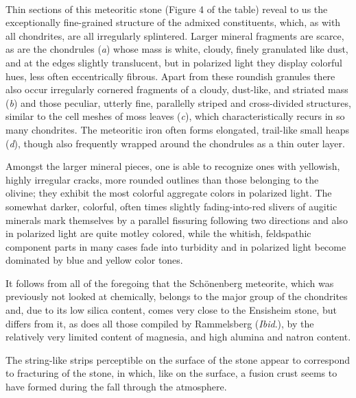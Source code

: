 \documentclass[a4paper, 12pt, oneside]{article}
\begin{document}
\paragraph*{}
Thin sections of this meteoritic stone (Figure 4 of the table) reveal to us the exceptionally fine-grained structure of the admixed constituents, which, as with all chondrites, are all irregularly splintered. Larger mineral fragments are scarce, as are the chondrules (\emph{a}) whose mass is white, cloudy, finely granulated like dust, and at the edges slightly translucent, but in polarized light they display colorful hues, less often eccentrically fibrous. Apart from these roundish granules there also occur irregularly cornered fragments of a cloudy, dust-like, and striated mass (\emph{b}) and those peculiar, utterly fine, parallelly striped and cross-divided structures, similar to the cell meshes of moss leaves (\emph{c}), which characteristically recurs in so many chondrites. The meteoritic iron often forms elongated, trail-like small heaps (\emph{d}), though also frequently wrapped around the chondrules as a thin outer layer.

Amongst the larger mineral pieces, one is able to recognize ones with yellowish, highly irregular cracks, more rounded outlines than those belonging to the olivine; they exhibit the most colorful aggregate colors in polarized light. The somewhat darker, colorful, often times slightly fading-into-red slivers of augitic minerals mark themselves by a parallel fissuring following two directions and also in polarized light are quite motley colored, while the whitish, feldspathic component parts in many cases fade into turbidity and in polarized light become dominated by blue and yellow color tones.

It follows from all of the foregoing that the Schönenberg meteorite, which was previously not looked at chemically, belongs to the major group of the chondrites and, due to its low silica content, comes very close to the Ensisheim stone, but differs from it, as does all those compiled by Rammelsberg (\emph{Ibid}.), by the relatively very limited content of magnesia, and high alumina and natron content.

The string-like strips perceptible on the surface of the stone appear to correspond to fracturing of the stone, in which, like on the surface, a fusion crust seems to have formed during the fall through the atmosphere.
\clearpage
\end{document}
